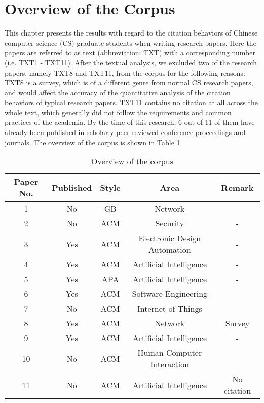 
\section{Overview of the Corpus}
This chapter presents the results with regard to the citation behaviors of Chinese computer science (CS) graduate students when writing research papers. Here the papers are referred to as text (abbreviation: TXT) with a corresponding number (i.e. TXT1 - TXT11). After the textual analysis, we excluded two of the research papers, namely TXT8 and TXT11, from the corpus for the following reasons: TXT8 is a survey, which is of a different genre from normal CS research papers, and would affect the accuracy of the quantitative analysis of the citation behaviors of typical research papers. TXT11 contains no citation at all across the whole text, which generally did not follow the requirements and common practices of the academia. By the time of this research, 6 out of 11 of them have already been published in scholarly peer-reviewed conference proceedings and journals. The overview of the corpus is shown in Table \ref{tab:corpus_overview}.

\begin{table}[htbp]
    \caption{Overview of the corpus}
    \centering
      \begin{tabular}{ccccc}
        \toprule[1.5pt]
        \textbf{Paper No.} & \textbf{Published} & \textbf{Style} & \textbf{Area} & \textbf{Remark} \\
        \midrule[1pt]
        1   &No&GB&Network&-\\
        2	&No	&ACM	&Security	&-\\
        3	&Yes	&ACM	&Electronic Design Automation	&-\\
        4	&Yes	&ACM	&Artificial Intelligence	&-\\
        5	&Yes	&APA	&Artificial Intelligence	&-\\
        6	&Yes	&ACM	&Software Engineering&	-\\
        7	&No	&ACM	&Internet of Things	&-\\
        8	&Yes	&ACM	&Network	&Survey\\
        9	&Yes	&ACM	&Artificial Intelligence	&-\\
        10	&No	&ACM	&Human-Computer Interaction	&-\\
        11	&No	&ACM	&Artificial Intelligence	&No citation\\
        
      \bottomrule[1.5pt]
    \end{tabular}
    \label{tab:corpus_overview}
  \end{table}

